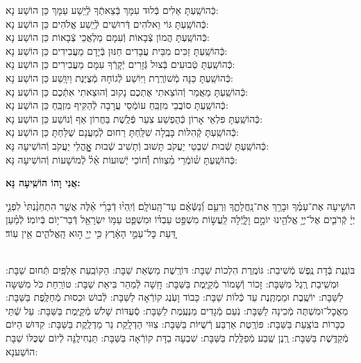 \documentclass[twoside, openany, parskip=half, 11pt]{book}
\begin{document}
\begin{small}
כְּֿהוֹשַֽׁעְתָּ אֵלִים בְּֿלוּד עִמָּךְ בְּֿצֵאתְֿךָ לְֿיֵֽשַׁע עַמָּךְ \hfill כֵּן הוֹשַׁע נָא: \\
כְּֿהוֹשַֽׁעְתָּ גּוֹי וֵאלֹהִים דְּֿרוּשִׁים לְֿיֵֽשַׁע אֱלֹהִים \hfill כֵּן הוֹשַׁע נָא: \\
כְּֿהוֹשַֽׁעְתָּ הֲמוֹן צְֿבָאוֹת וְֿעִמָּם מַלְאֲכֵי צְֿבָאוֹת \hfill כֵּן הוֹשַׁע נָא: \\
כְּֿהוֹשַֽׁעְתָּ זַכִּים מִבֵּית עֲבָדִים חַנּוּן בְּֿיָדָם מַעֲבִידִים \hfill כֵּן הוֹשַׁע נָא: \\
כְּֿהוֹשַֽׁעְתָּ טְֿבוּעִים בְּֿצוּל גְּֿזָרִים יְֿקָרְֿךָ עִמָּם מַעֲבִירִים \hfill כֵּן הוֹשַׁע נָא: \\
כְּֿהוֹשַֽׁעְתָּ כַּנָּה מְֿשׁוֹרֶֽרֶת וַיּֽוֹשַׁע לְֿגוֹחָהּ מְֿצֻיֶּנֶת וַיִוָּֽשַׁע \hfill כֵּן הוֹשַׁע נָא: \\
כְּֿהוֹשַֽׁעְתָּ מַאֲמַר וְֿהוֹצֵאתִי אֶתְכֶם נָקוּב וְֿהוּצֵאתִי אִתְּֿכֶם \hfill כֵּן הוֹשַׁע נָא:\\
כְּֿהוֹשַֽׁעְתָּ סוֹבֲבֵי מִזְבֵּֽחַ עוֹמְֿסֵי עֲרָבָה לְֿהַקִּיף מִזְבֵּֽחַ \hfill כֵּן הוֹשַׁע נָא: \\
כְּֿהוֹשַֽׁעְתָּ פִּלְאֵי אָרוֹן כְּֿהֻפְשַׁע צִעֵר פְּֿלֶֽשֶׁת בַּחֲרוֹן אַף וְֿנוֹשַׁע \hfill כֵּן הוֹשַׁע נָא:\\
כְּֿהוֹשַֽׁעְתָּ קְֿהִלּוֹת בָּבֶֽלָה שִׁלַּֽחְתָּ רַחוּם לְֿמַעֲנָם שֻׁלַּחְתָּ \hfill כֵּן הוֹשַׁע נָא:\\

כְּֿהוֹשַֽׁעְתָּ שְֿׁבוּת שִׁבְטֵי יַעֲקֹב תָּשׁוּב וְֿתָשִׁיב שְֿׁבוּת אׇׇׇׇָהֳלֵי יַעֲקֹב \hfill וְֿהוֹשִׁיעָה נָּא:\\
כְּֿהוֹשַֽׁעְתָּ שׁ֗וֹמְֿרֵי מִ֗צְווֹת וְֿ֗חוֹכֵי יְֿשׁוּעוֹת אֵ֗ל֗ לְֿמוֹשָׁעוֹת \hfill וְֿהוֹשִׁיעָה נָּא:

\end{small}

\begin{large}
\textbf{אֲנִי וָהוֹ הוֹשִֽׁיעָה נָּא:}
\end{large}

הוֹשִׁ֤יעָה אֶת־עַמֶּ֗ךָ וּבָרֵ֥ךְ אֶת־נַֽחֲלָתֶ֑ךָ וּֽרְעֵ֥ם וְֿ֝נַשְּֿׂאֵ֗ם עַד־הָֽעוֹלָֽם׃ וְֿיִֽהְי֨וּ דְֿבָרַ֜י אֵ֗לֶּה אֲשֶׁ֤ר הִתְחַנַּ֨נְתִּי֙ לִפְנֵ֣י יְיָ֔ קְֿרֹבִ֛ים אֶל־יְיָ֥ אֱלֹהֵ֖ינוּ יוֹמָ֣ם וָלָ֑יְֿלָה לַֽעֲשׂ֣וֹת מִשְׁפַּ֣ט עַבְדּ֗וֹ וּמִשְׁפַּ֛ט עַמּ֥וֹ יִשְׂרָאֵ֖ל דְּֿבַר־י֥וֹם בְּֿיוֹמֽוֹ׃ לְֿמַ֗עַן דַּ֚עַת כׇּל־עַמֵּ֣י הָאָ֔רֶץ כִּ֥י יְיָ֖ ה֣וּא הָֽאֱלֹהִ֑ים אֵ֖ין עֽוֹד׃

\sepline

\\
בּוֹנֶֽנֶת בְּֿדָת נֶֽפֶשׁ מְֿשִׁיבַת: גּוֹמֶֽרֶת הִלְכוֹת שַׁבָּת: דּוֹרֶֽשֶׁת מַשְׂאַת שַׁבָּת: הַקּוֹבַֽעַת אַלְפַּֽיִם תְּֿחוּם שַׁבָּת: וּמְשִֽׁיבַת רֶֽגֶל מִשַּׁבָּת: זָכוֹר וְֿשָׁמוֹר מְֿקַיֶּֽמֶת בַּשַּׁבָּת: חָֽשָׁה לְֿמַהֵר בִּיאַת שַׁבָּת: טוֹרַֽחַת כֹּל מִשִּׁשָּה לַשַּׁבָּת: יוֹשֶֽׁבֶת וּמַמְתֶּֽנֶת עַד כְּֿלוֹת שַׁבָּת: כָּבוֹד וָעֹֽנֶג קוֹרְֿאָה לַשַּׁבָּת: לְֿבוּשׁ וּכְסוּת מְֿחַלֶּֽפֶת בַּשַּׁבָּת: מַאֲכׇל־וּמִשְׁתֶּה מְֿכִינָה לַשַּׁבָּת: נֹֽעַם מְֿגָדִים מַנְעֶֽמֶת לַשַּׁבָּת: סְֿעֻדּוֹת שָׁלֹשׁ מְֿקַיֶּֽמֶת בַּשַּׁבָּת: עַל שְֿׁתֵּי כִכָּרוֹת בּוֹצַֽעַת בַּשַּׁבָּת: פּוֹרֶֽטֶת אַרְבַּע רְֿשֻׁיּוֹת בַּשַּׁבָּת: צִוּוּי הַדְלָֽקַת נֵר מַדְלֶֽקֶת בַּשַּׁבָּת: קִדּוּשׁ הַיּוֹם מְֿקַדֶּֽשֶׁת בַּשַּׁבָּת: רֶֽנֶן שֶֽׁבַע מְֿפַלֶּֽלֶת בַּשַּׁבָּת: שִׁבְעָה בַדָּת קוֹרְֿאָה בַּשַּׁבָּת: תַּנְחִילֶֽנָּה לְֿיוֹם שֶׁכֻּלּוֹ שַׁבָּת הוֹשַׁענָא:
\end{document}

